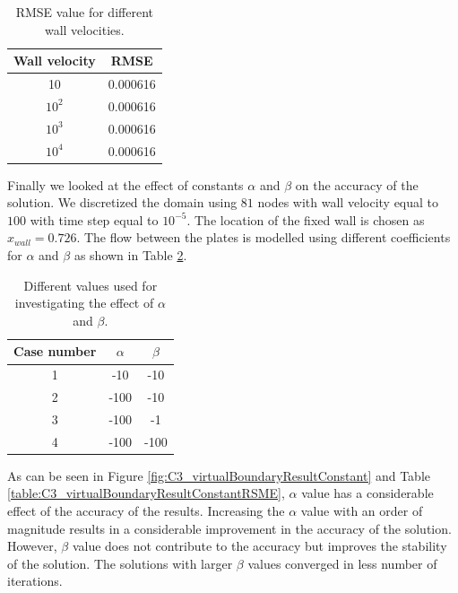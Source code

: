 \begin{table}[H]
\centering
\begin{tabular}{c | c}
	 Wall velocity & RMSE \\ \hline \hline
	 10 & 0.000616\\ \hline
	 $10^2$ & 0.000616 \\ \hline
	 $10^3$ & 0.000616 \\ \hline
	 $10^4$ & 0.000616 \\
\end{tabular}
\caption{RMSE value for different wall velocities.}
\label{table:C3_virtualBoundaryResultWallVelocityRMSE}
\end{table}

Finally we looked at the effect of constants $\alpha$ and $\beta$ on the accuracy of the solution. We discretized the domain using $81$ nodes with wall velocity equal to $100$ with time step equal to $10^{-5}$. The location of the fixed wall is chosen as $x_{wall} = 0.726$. The flow between the plates is modelled using different coefficients for $\alpha$ and $\beta$ as shown in Table \ref{table:C3_alphaBetaValues}.

\begin{table}[H]
\centering
\begin{tabular}{c | c | c}
	 Case number & $\alpha$ & $\beta$ \\ \hline \hline
	 1 & -10 & -10 \\ \hline
	 2 & -100 & -10 \\ \hline
	 3 & -100 & -1 \\ \hline
	 4 & -100 & -100 \\
\end{tabular}
\caption{Different values used for investigating the effect of $\alpha$ and $\beta$.}
\label{table:C3_alphaBetaValues}
\end{table}

As can be seen in Figure \ref{fig:C3_virtualBoundaryResultConstant} and Table \ref{table:C3_virtualBoundaryResultConstantRSME}, $\alpha$ value has a considerable effect of the accuracy of the results. Increasing the $\alpha$ value with an order of magnitude results in a considerable improvement in the accuracy of the solution. However, $\beta$ value does not contribute to the accuracy but improves the stability of the solution. The solutions with larger $\beta$ values converged in less number of iterations.

